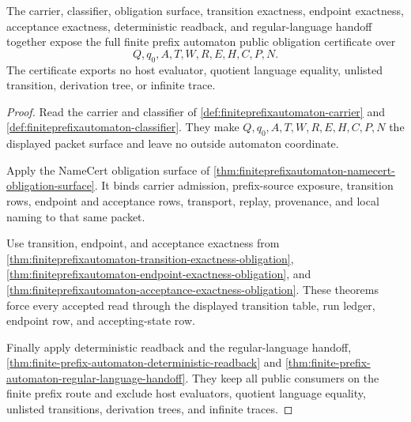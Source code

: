 \begin{theorem}
\label{thm:finiteprefixautomaton-obligation-public-certificate}
The carrier, classifier, obligation surface, transition exactness, endpoint exactness, acceptance exactness, deterministic readback, and regular-language handoff together expose the full finite prefix automaton public obligation certificate over
$$
Q,q_0,A,T,W,R,E,H,C,P,N .
$$
The certificate exports no host evaluator, quotient language equality, unlisted transition, derivation tree, or infinite trace.
\end{theorem}
\begin{proof}
Read the carrier and classifier of \autoref{def:finiteprefixautomaton-carrier} and \autoref{def:finiteprefixautomaton-classifier}. They make $Q,q_0,A,T,W,R,E,H,C,P,N$ the displayed packet surface and leave no outside automaton coordinate.

Apply the NameCert obligation surface of \autoref{thm:finiteprefixautomaton-namecert-obligation-surface}. It binds carrier admission, prefix-source exposure, transition rows, endpoint and acceptance rows, transport, replay, provenance, and local naming to that same packet.

Use transition, endpoint, and acceptance exactness from \autoref{thm:finiteprefixautomaton-transition-exactness-obligation}, \autoref{thm:finiteprefixautomaton-endpoint-exactness-obligation}, and \autoref{thm:finiteprefixautomaton-acceptance-exactness-obligation}. These theorems force every accepted read through the displayed transition table, run ledger, endpoint row, and accepting-state row.

Finally apply deterministic readback and the regular-language handoff, \autoref{thm:finite-prefix-automaton-deterministic-readback} and \autoref{thm:finite-prefix-automaton-regular-language-handoff}. They keep all public consumers on the finite prefix route and exclude host evaluators, quotient language equality, unlisted transitions, derivation trees, and infinite traces.
\end{proof}

